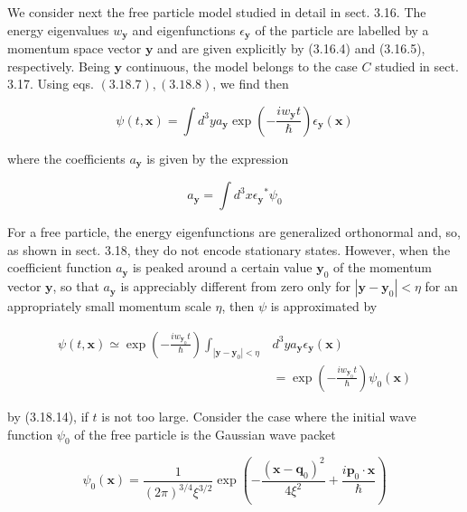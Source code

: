 \documentclass{article}
\begin{document}
We consider next the free particle model studied in detail in sect. 3.16. The
energy eigenvalues $w_{\boldsymbol{y}}$ and eigenfunctions $\epsilon_{\boldsymbol{y}}$ of the particle are labelled by a momentum space vector $\boldsymbol{y}$ and are given explicitly by (3.16.4) and (3.16.5), respectively. Being $\boldsymbol{y}$ continuous, the model belongs to the case $C$ studied in sect. 3.17. Using eqs. $(3.18 .7),(3.18 .8)$, we find then
 
\begin{equation*}
\psi(t, \boldsymbol{x})=\int d^{3} y a_{\boldsymbol{y}} \exp \left(-\frac{i w_{\boldsymbol{y}} t}{\hbar}\right) \epsilon_{\boldsymbol{y}}(\boldsymbol{x}) \tag{3.19.10}
\end{equation*}
 
where the coefficients $a_{\boldsymbol{y}}$ is given by the expression
 
\begin{equation*}
a_{\boldsymbol{y}}=\int d^{3} x \epsilon_{\boldsymbol{y}}{ }^{*} \psi_{0} \tag{3.19.11}
\end{equation*}
 

For a free particle, the energy eigenfunctions are generalized orthonormal and, so, as shown in sect. 3.18, they do not encode stationary states. However, when the coefficient function $a_{\boldsymbol{y}}$ is peaked around a certain value $\boldsymbol{y}_{0}$ of the momentum vector $\boldsymbol{y}$, so that $a_{\boldsymbol{y}}$ is appreciably different from zero only for $\left|\boldsymbol{y}-\boldsymbol{y}_{0}\right|<\eta$ for an appropriately small momentum scale $\eta$, then $\psi$ is approximated by
 
\begin{align*}
\psi(t, \boldsymbol{x}) \simeq \exp \left(-\frac{i w_{\boldsymbol{y}_{0}} t}{\hbar}\right) \int_{\left|\boldsymbol{y}-\boldsymbol{y}_{0}\right|<\eta} & d^{3} y a_{\boldsymbol{y}} \epsilon_{\boldsymbol{y}}(\boldsymbol{x})  \tag{3.19.12}\\
& =\exp \left(-\frac{i w_{\boldsymbol{y}_{0}} t}{\hbar}\right) \psi_{0}(\boldsymbol{x})
\end{align*}
 
by (3.18.14), if $t$ is not too large.
Consider the case where the initial wave function $\psi_{0}$ of the free particle is the Gaussian wave packet
 
\begin{equation*}
\psi_{0}(\boldsymbol{x})=\frac{1}{(2 \pi)^{3 / 4} \xi^{3 / 2}} \exp \left(-\frac{\left(\boldsymbol{x}-\boldsymbol{q}_{0}\right)^{2}}{4 \xi^{2}}+\frac{i \boldsymbol{p}_{0} \cdot \boldsymbol{x}}{\hbar}\right) \tag{3.19.13}
\end{equation*}
 
\end{document}
